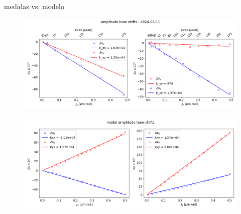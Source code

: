 \documentclass[aspectratio=169]{beamer}            %
\begin{document}
\begin{frame}{medidas vs. modelo}
\begin{figure}
    \centering
    \includegraphics[scale=0.25]{2024-06-21/figures/adts110624.png}
\end{figure}
\begin{figure}
    \centering
    \includegraphics[scale=0.25]{2024-06-21/figures/adts_model.png}
\end{figure}
    
\end{frame}
\end{document}
